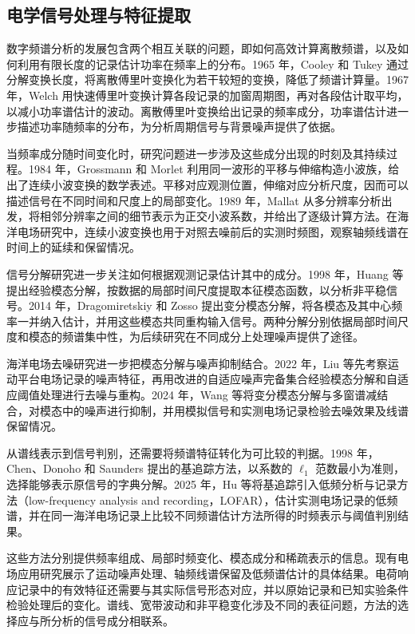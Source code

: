 \subsection{电学信号处理与特征提取}

数字频谱分析的发展包含两个相互关联的问题，即如何高效计算离散频谱，以及如何利用有限长度的记录估计功率在频率上的分布。1965 年，Cooley 和 Tukey 通过分解变换长度，将离散傅里叶变换化为若干较短的变换，降低了频谱计算量\cite{cooley1965}。1967 年，Welch 用快速傅里叶变换计算各段记录的加窗周期图，再对各段估计取平均，以减小功率谱估计的波动\cite{welch1967}。离散傅里叶变换给出记录的频率成分，功率谱估计进一步描述功率随频率的分布，为分析周期信号与背景噪声提供了依据。

当频率成分随时间变化时，研究问题进一步涉及这些成分出现的时刻及其持续过程。1984 年，Grossmann 和 Morlet 利用同一波形的平移与伸缩构造小波族，给出了连续小波变换的数学表述。平移对应观测位置，伸缩对应分析尺度，因而可以描述信号在不同时间和尺度上的局部变化\cite{grossmannMorlet1984}。1989 年，Mallat 从多分辨率分析出发，将相邻分辨率之间的细节表示为正交小波系数，并给出了逐级计算方法\cite{mallat1989}。在海洋电场研究中，连续小波变换也用于对照去噪前后的实测时频图，观察轴频线谱在时间上的延续和保留情况\cite{wang2024vmd}。

信号分解研究进一步关注如何根据观测记录估计其中的成分。1998 年，Huang 等提出经验模态分解，按数据的局部时间尺度提取本征模态函数，以分析非平稳信号\cite{huang1998}。2014 年，Dragomiretskiy 和 Zosso 提出变分模态分解，将各模态及其中心频率一并纳入估计，并用这些模态共同重构输入信号\cite{dragomiretskiyZosso2014}。两种分解分别依据局部时间尺度和模态的频谱集中性，为后续研究在不同成分上处理噪声提供了途径。

海洋电场去噪研究进一步把模态分解与噪声抑制结合。2022 年，Liu 等先考察运动平台电场记录的噪声特征，再用改进的自适应噪声完备集合经验模态分解和自适应阈值处理进行去噪与重构\cite{liu2022motion}。2024 年，Wang 等将变分模态分解与多窗谱减结合，对模态中的噪声进行抑制，并用模拟信号和实测电场记录检验去噪效果及线谱保留情况\cite{wang2024vmd}。

从谱线表示到信号判别，还需要将频谱特征转化为可比较的判据。1998 年，Chen、Donoho 和 Saunders 提出的基追踪方法，以系数的 $\ell_1$ 范数最小为准则，选择能够表示原信号的字典分解\cite{chen1998basis}。2025 年，Hu 等将基追踪引入低频分析与记录方法（low-frequency analysis and recording，LOFAR），估计实测电场记录的低频谱，并在同一海洋电场记录上比较不同频谱估计方法所得的时频表示与阈值判别结果\cite{hu2025lofar}。

这些方法分别提供频率组成、局部时频变化、模态成分和稀疏表示的信息。现有电场应用研究展示了运动噪声处理、轴频线谱保留及低频谱估计的具体结果。电荷响应记录中的有效特征还需要与其实际信号形态对应，并以原始记录和已知实验条件检验处理后的变化。谱线、宽带波动和非平稳变化涉及不同的表征问题，方法的选择应与所分析的信号成分相联系。

